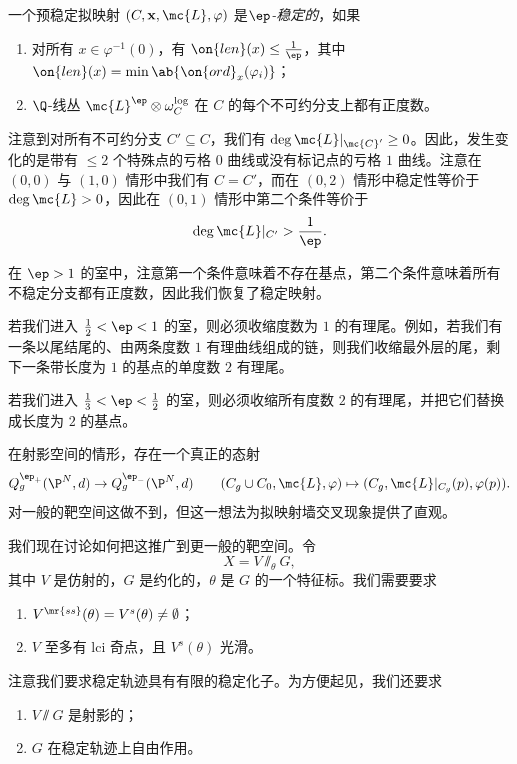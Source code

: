 \begin{defn}
    一个预稳定拟映射 \((C, \mathbf{x}, \mc{L}, \varphi)\) 是\textit{\(\ep\)-稳定的}，如果
    \begin{enumerate}
        \item 对所有 \(x \in \varphi^{-1}(0)\)，有 \(\on{len}(x) \leq \frac{1}{\ep}\)，其中 \(\on{len}(x) = \min \ab\{ \on{ord}_x (\varphi_i)\}\)；
        \item \(\Q\)-线丛 \(\mc{L}^{\ep} \otimes \omega_C^{\log}\) 在 \(C\) 的每个不可约分支上都有正度数。
    \end{enumerate}
\end{defn}

注意到对所有不可约分支 \(C' \subseteq C\)，我们有 \(\deg \mc{L}|_{\mc{C}'} \geq 0\)。因此，发生变化的是带有 \(\leq 2\) 个特殊点的亏格 \(0\) 曲线或没有标记点的亏格 \(1\) 曲线。注意在 \((0,0)\) 与 \((1,0)\) 情形中我们有 \(C = C'\)，而在 \((0,2)\) 情形中稳定性等价于 \(\deg \mc{L} > 0\)，因此在 \((0,1)\) 情形中第二个条件等价于 
\[ \deg \mc{L}|_{C'} > \frac{1}{\ep}. \]

\begin{exm}
    在 \(\ep > 1\) 的室中，注意第一个条件意味着不存在基点，第二个条件意味着所有不稳定分支都有正度数，因此我们恢复了稳定映射。

    若我们进入 \(\frac{1}{2} < \ep < 1\) 的室，则必须收缩度数为 \(1\) 的有理尾。例如，若我们有一条以尾结尾的、由两条度数 \(1\) 有理曲线组成的链，则我们收缩最外层的尾，剩下一条带长度为 \(1\) 的基点的单度数 \(2\) 有理尾。 

    若我们进入 \(\frac{1}{3} < \ep < \frac{1}{2}\) 的室，则必须收缩所有度数 \(2\) 的有理尾，并把它们替换成长度为 \(2\) 的基点。 
\end{exm}

\begin{rmk}
    在射影空间的情形，存在一个真正的态射
    \[ Q_g^{\ep_+}(\P^N, d) \to Q_g^{\ep_-}(\P^N, d) \qquad (C_g \cup C_0, \mc{L}, \varphi) \mapsto (C_g, \mc{L}|_{C_g}(p), \varphi(p)). \]
    对一般的靶空间这做不到，但这一想法为拟映射墙交叉现象提供了直观。
\end{rmk}

我们现在讨论如何把这推广到更一般的靶空间。令
\[ X = V \sslash_{\theta} G, \]
其中 \(V\) 是仿射的，\(G\) 是约化的，\(\theta\) 是 \(G\) 的一个特征标。我们需要要求
\begin{enumerate}
    \item \(V^{\mr{ss}}(\theta) = V^s(\theta) \neq \emptyset\)；
    \item \(V\) 至多有 lci 奇点，且 \(V^s(\theta)\) 光滑。
\end{enumerate}
注意我们要求稳定轨迹具有有限的稳定化子。为方便起见，我们还要求
\begin{enumerate}
    \item \(V \sslash G\) 是射影的；
    \item \(G\) 在稳定轨迹上自由作用。
\end{enumerate}

